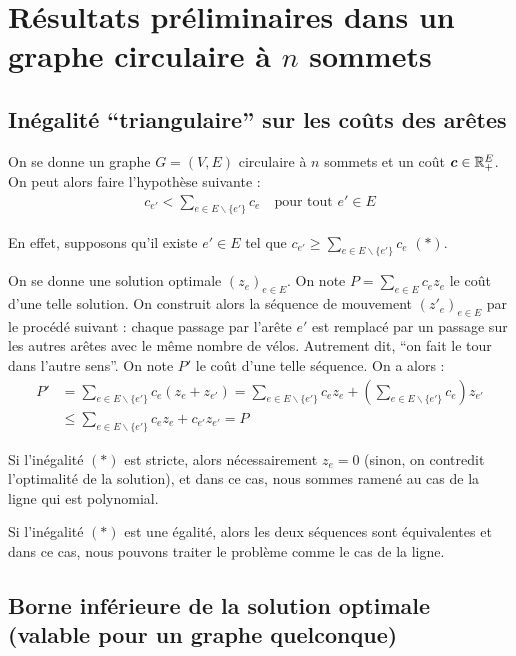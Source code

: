 \chapter{Résultats préliminaires dans un graphe circulaire à $n$ sommets}
\label{Résultats préliminaires}

\section{Inégalité ``triangulaire'' sur les coûts des arêtes}
\label{sec: Inégalité triangulaire}

On se donne un graphe $G=(V,E)$ circulaire à $n$ sommets et un coût $\boldsymbol{c} \in \mathbb{R}^E_+$. On peut alors faire l'hypothèse suivante :
\begin{gather}\label{Inégalité Triangulaire}
  c_{e'}<\sum_{e \in E \backslash \{e'\}} c_e \quad \text{pour tout } e' \in E
\end{gather}

En effet, supposons qu'il existe $e' \in E$ tel que $c_{e'} \ge \sum_{e \in E \backslash \{e'\}} c_e$ $(*)$.

On se donne une solution optimale $(z_e)_{e \in E}$. On note $P = \sum_{e \in E} c_ez_e$ le coût d'une telle solution. On construit alors la séquence de mouvement $(z'_e)_{e \in E}$ par le procédé suivant : chaque passage par l'arête $e'$ est remplacé par un passage sur les autres arêtes avec le même nombre de vélos. Autrement dit, ``on fait le tour dans l'autre sens''. On note $P'$ le coût d'une telle séquence. On a alors :
\begin{align*}
  P' &= \sum_{e \in E \backslash \{e'\}} c_e (z_e + z_{e'}) = \sum_{e \in E \backslash \{e'\}} c_ez_e + \left(\sum_{e \in E \backslash \{e'\}} c_{e}\right)z_{e'} \\
     &\le \sum_{e \in E \backslash \{e'\}} c_ez_e + c_{e'}z_{e'} = P
\end{align*}

Si l'inégalité $(*)$ est stricte, alors nécessairement $z_e = 0$ (sinon, on contredit l'optimalité de la solution), et dans ce cas, nous sommes ramené au cas de la ligne qui est polynomial.

Si l'inégalité $(*)$ est une égalité, alors les deux séquences sont équivalentes et dans ce cas, nous pouvons traiter le problème comme le cas de la ligne.

\section{Borne inférieure de la solution optimale (valable pour un graphe quelconque)}
\label{Borne inf générale}

